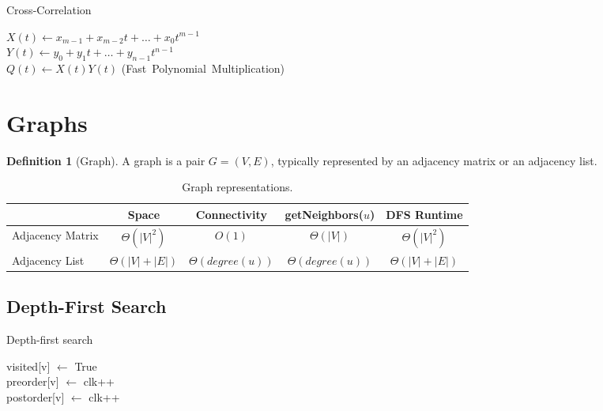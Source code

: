 \documentclass[11pt]{article}
\theoremstyle{definition}
\newtheorem{definition}{Definition}[section]
\theoremstyle{remark}
\begin{document}
\begin{algorithm}
    \caption{Cross-Correlation}
 
    \DontPrintSemicolon
    
    $X(t) \gets x_{m-1} + x_{m-2}t + \dots + x_0 t^{m-1}$ \\
    $Y(t) \gets y_0 + y_1 t + \dots + y_{n-1} t^{n-1}$ \\
    $Q(t) \gets X(t)Y(t)$ \quad \mbox{(Fast Polynomial Multiplication)}\\
\end{algorithm}

\section{Graphs}
\begin{definition}[Graph] A graph is a pair $G=(V,E)$, typically represented by an adjacency matrix or an adjacency list.
\end{definition}

\begin{table}[ht]
\centering
\caption{Graph representations.}
\begin{tabular}[t]{lcccc}
\hline
& Space & Connectivity & getNeighbors($u$) & DFS Runtime\\
\hline
Adjacency Matrix & $\Theta(|V|^2)$ & $O(1)$ & $\Theta(|V|)$ & $\Theta(|V|^2)$\\
Adjacency List & $\Theta(|V|+|E|)$ & $\Theta(degree(u))$ & $\Theta(degree(u))$ & $\Theta(|V|+|E|)$ \\
\hline
\end{tabular}
\end{table}

\subsection{Depth-First Search}

\begin{algorithm}[ht]
    \caption{Depth-first search}
 
    \DontPrintSemicolon
    
    
	 {
		visited[v] $\gets$ True \\
		preorder[v] $\gets$ clk++ \\
		postorder[v] $\gets$ clk++ \\
	}
\end{algorithm}
\end{document}
